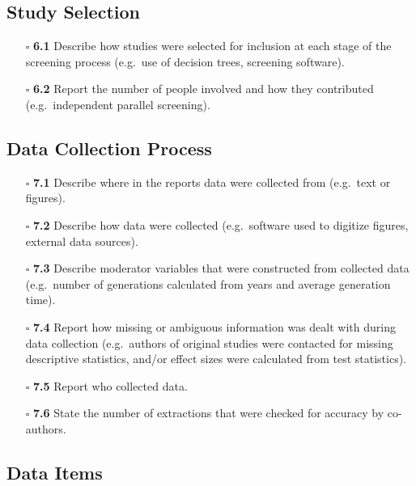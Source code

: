 \documentclass[11pt]{article}
\def\tightlist{}
\begin{document}
\begin{Form}
\subsection{Study Selection}\label{study-selection}

\begin{itemize}
\tightlist
\item[$\square$]
  \textbf{6.1} Describe how studies were selected for inclusion at each
  stage of the screening process (e.g.~use of decision trees, screening
  software).
\item[$\square$]
  \textbf{6.2} Report the number of people involved and how they
  contributed (e.g.~independent parallel screening).
\end{itemize}

\subsection{Data Collection Process}\label{data-collection-process}

\begin{itemize}
\tightlist
\item[$\square$]
  \textbf{7.1} Describe where in the reports data were collected from
  (e.g.~text or figures).
\item[$\square$]
  \textbf{7.2} Describe how data were collected (e.g.~software used to
  digitize figures, external data sources).
\item[$\square$]
  \textbf{7.3} Describe moderator variables that were constructed from
  collected data (e.g.~number of generations calculated from years and
  average generation time).
\item[$\square$]
  \textbf{7.4} Report how missing or ambiguous information was dealt
  with during data collection (e.g.~authors of original studies were
  contacted for missing descriptive statistics, and/or effect sizes were
  calculated from test statistics).
\item[$\square$]
  \textbf{7.5} Report who collected data.
\item[$\square$]
  \textbf{7.6} State the number of extractions that were checked for
  accuracy by co-authors.
\end{itemize}

\subsection{Data Items}\label{data-items}


\end{Form}
\end{document}
